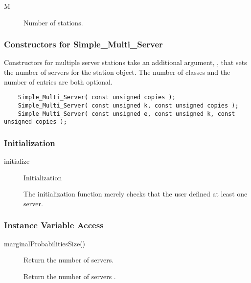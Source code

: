 \begin{description}
\item[M] \texonly{---} Number of stations.
\end{description}

\subsubsection{Constructors for Simple_Multi_Server}

Constructors for multiple server stations take an additional argument,
, that sets the number of servers for the station object.
The number of classes  and the number of entries  are
both optional.

\begin{verbatim}
    Simple_Multi_Server( const unsigned copies );
    Simple_Multi_Server( const unsigned k, const unsigned copies );
    Simple_Multi_Server( const unsigned e, const unsigned k, const unsigned copies );
\end{verbatim}

\subsubsection{Initialization}

\begin{description}
\item[initialize] \texonly{---} Initialization\\

  The initialization function merely checks that the user defined at
  least one server.
\end{description}

\subsubsection{Instance Variable Access}

\begin{description}
\item[marginalProbabilitiesSize()] \texonly{---} Return the number of servers.\\

  Return the number of servers .

\end{description}

